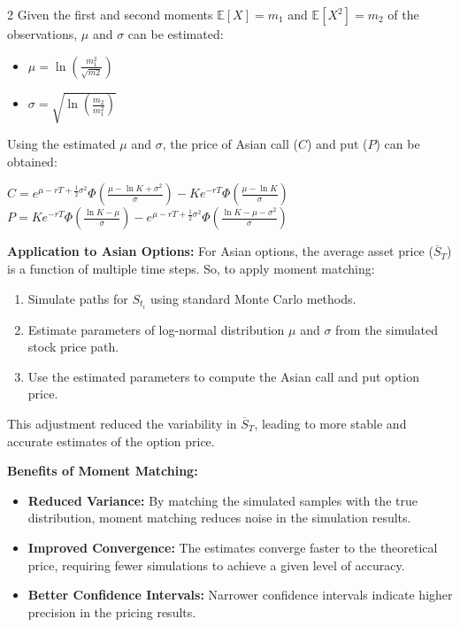 \begin{multicols}{2}
Given the first and second moments $\mathbb{E}[X]=m_1$ and $\mathbb{E}[X^2]=m_2$ of the observations, $\mu$ and $\sigma$ can be estimated\cite{chan2015moments}:

\begin{itemize}
    \item $\mu=\ln(\frac{m_1^2}{\sqrt{m2}})$
    \item $\sigma=\sqrt{\ln(\frac{m_2}{m_1^2})}$
\end{itemize}

Using the estimated {$\mu$} and {$\sigma$}, the price of Asian call ($C$) and put ($P$) can be obtained\cite{chan2015moments}:

$C=e^{\mu-rT+\frac{1}{2}\sigma^2}\Phi(\frac{\mu-\ln K + \sigma^2}{\sigma})-Ke^{-rT}\Phi(\frac{\mu-\ln K}{\sigma})$
$P=Ke^{-rT}\Phi(\frac{\ln K-\mu}{\sigma})-e^{\mu-rT+\frac{1}{2}\sigma^2}\Phi(\frac{\ln K -\mu - \sigma^2}{\sigma})$

\textbf{Application to Asian Options:}  
For Asian options, the average asset price (\(\overline{S}_T\)) is a function of multiple time steps. So, to apply moment matching:
\begin{enumerate}
    \item Simulate paths for \(S_{t_i}\) using standard Monte Carlo methods.
    \item Estimate parameters of log-normal distribution $\mu$ and $\sigma$ from the simulated stock price path.
    \item Use the estimated parameters to compute the Asian call and put option price.
\end{enumerate}
This adjustment reduced the variability in \(\overline{S}_T\), leading to more stable and accurate estimates of the option price.

\textbf{Benefits of Moment Matching:}
\begin{itemize}
    \item \textbf{Reduced Variance:} By matching the simulated samples with the true distribution, moment matching reduces noise in the simulation results.
    \item \textbf{Improved Convergence:} The estimates converge faster to the theoretical price, requiring fewer simulations to achieve a given level of accuracy.
    \item \textbf{Better Confidence Intervals:} Narrower confidence intervals indicate higher precision in the pricing results.
\end{itemize}


\end{multicols}

